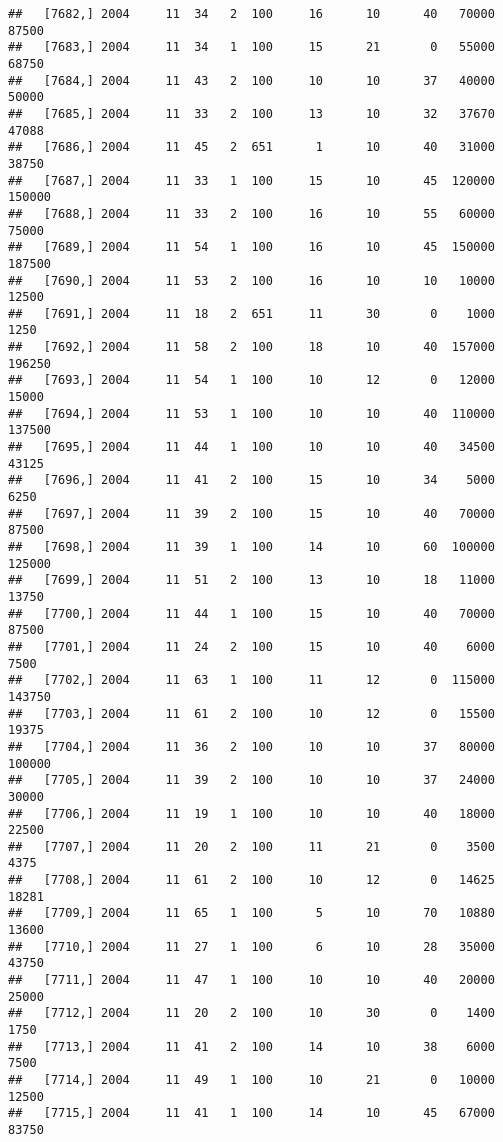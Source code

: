 \documentclass{article}\usepackage[]{graphicx}\usepackage[]{color}
\makeatletter
\newenvironment{kframe}{%
 \def\at@end@of@kframe{}%
 \ifinner\ifhmode%
  \def\at@end@of@kframe{\end{minipage}}%
  \begin{minipage}{\columnwidth}%
 \fi\fi%
 \def\FrameCommand##1{\hskip\@totalleftmargin \hskip-\fboxsep
 \colorbox{shadecolor}{##1}\hskip-\fboxsep
     \hskip-\linewidth \hskip-\@totalleftmargin \hskip\columnwidth}%
 \MakeFramed {\advance\hsize-\width
   \@totalleftmargin\z@ \linewidth\hsize
   \@setminipage}}%
 {\par\unskip\endMakeFramed%
 \at@end@of@kframe}
\newenvironment{knitrout}{}{} %
\makeatother
\begin{document}
\begin{knitrout}
\begin{kframe}
\begin{verbatim}
##   [7682,] 2004     11  34   2  100     16      10      40   70000   87500
##   [7683,] 2004     11  34   1  100     15      21       0   55000   68750
##   [7684,] 2004     11  43   2  100     10      10      37   40000   50000
##   [7685,] 2004     11  33   2  100     13      10      32   37670   47088
##   [7686,] 2004     11  45   2  651      1      10      40   31000   38750
##   [7687,] 2004     11  33   1  100     15      10      45  120000  150000
##   [7688,] 2004     11  33   2  100     16      10      55   60000   75000
##   [7689,] 2004     11  54   1  100     16      10      45  150000  187500
##   [7690,] 2004     11  53   2  100     16      10      10   10000   12500
##   [7691,] 2004     11  18   2  651     11      30       0    1000    1250
##   [7692,] 2004     11  58   2  100     18      10      40  157000  196250
##   [7693,] 2004     11  54   1  100     10      12       0   12000   15000
##   [7694,] 2004     11  53   1  100     10      10      40  110000  137500
##   [7695,] 2004     11  44   1  100     10      10      40   34500   43125
##   [7696,] 2004     11  41   2  100     15      10      34    5000    6250
##   [7697,] 2004     11  39   2  100     15      10      40   70000   87500
##   [7698,] 2004     11  39   1  100     14      10      60  100000  125000
##   [7699,] 2004     11  51   2  100     13      10      18   11000   13750
##   [7700,] 2004     11  44   1  100     15      10      40   70000   87500
##   [7701,] 2004     11  24   2  100     15      10      40    6000    7500
##   [7702,] 2004     11  63   1  100     11      12       0  115000  143750
##   [7703,] 2004     11  61   2  100     10      12       0   15500   19375
##   [7704,] 2004     11  36   2  100     10      10      37   80000  100000
##   [7705,] 2004     11  39   2  100     10      10      37   24000   30000
##   [7706,] 2004     11  19   1  100     10      10      40   18000   22500
##   [7707,] 2004     11  20   2  100     11      21       0    3500    4375
##   [7708,] 2004     11  61   2  100     10      12       0   14625   18281
##   [7709,] 2004     11  65   1  100      5      10      70   10880   13600
##   [7710,] 2004     11  27   1  100      6      10      28   35000   43750
##   [7711,] 2004     11  47   1  100     10      10      40   20000   25000
##   [7712,] 2004     11  20   2  100     10      30       0    1400    1750
##   [7713,] 2004     11  41   2  100     14      10      38    6000    7500
##   [7714,] 2004     11  49   1  100     10      21       0   10000   12500
##   [7715,] 2004     11  41   1  100     14      10      45   67000   83750

\end{verbatim}
\end{kframe}
\end{knitrout}
\end{document}
